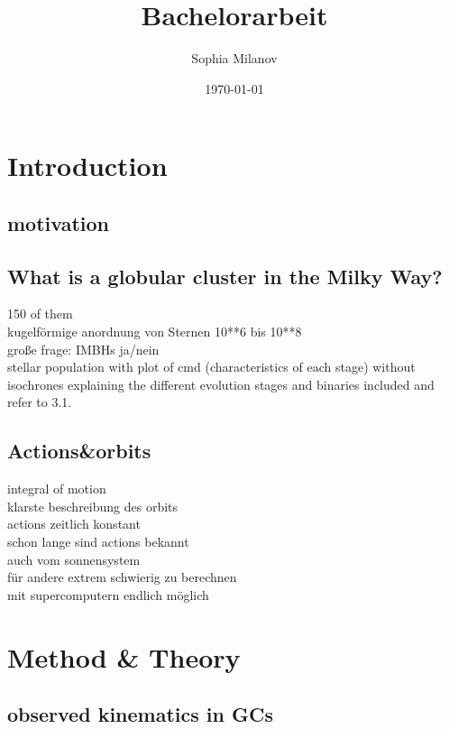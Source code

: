 \documentclass[a4paper,12pt,abstracton]{scrartcl}
\title{Bachelorarbeit}
\author{Sophia Milanov}
\date{\today}
\begin{document}


\begin{abstract}
\Blindtext 
\end{abstract}

\newpage

\tableofcontents

\newpage
\section{Introduction}
\subsection{motivation}
\subsection{What is a globular cluster in the Milky Way?}
150 of them \\
kugelförmige anordnung von Sternen 10**6 bis 10**8\\
große frage: IMBHs ja/nein\\
stellar population with plot of cmd (characteristics of each stage) without isochrones explaining the different evolution stages and binaries included and refer to 3.1.
\subsection{Actions\&orbits}
integral of motion\\
klarste beschreibung des orbits\\
actions zeitlich konstant\\
schon lange sind actions bekannt\\
auch vom sonnensystem\\
für andere extrem schwierig zu berechnen\\
mit supercomputern endlich möglich


\newpage
\section{Method \& Theory}
\subsection{observed kinematics in GCs}
\end{document}
